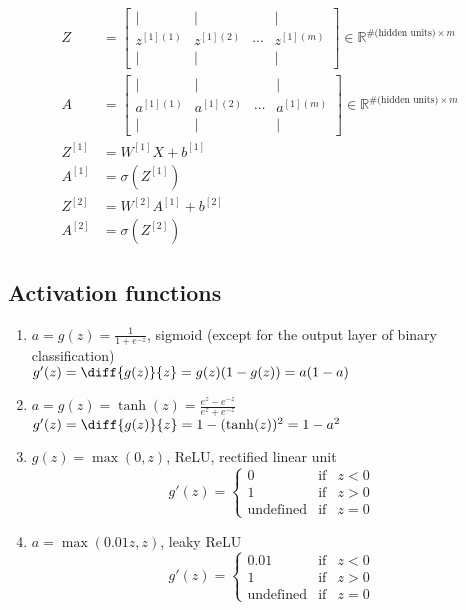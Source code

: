 \begin{itemize}
\begin{align*}
    Z & = \begin{bmatrix} |&|& &| \\ z^{[1](1)} & z^{[1](2)} & \cdots & z^{[1](m)} \\ |&|& &| \end{bmatrix} \in \mathbb{R}^{\#\text{(hidden units)} \times m}\\
     A & = \begin{bmatrix} |&|& &| \\ a^{[1](1)} & a^{[1](2)} & \cdots & a^{[1](m)} \\ |&|& &| \end{bmatrix} \in \mathbb{R}^{\#\text{(hidden units)} \times m}\\
     Z^{[1]} &= W^{[1]}X + b^{[1]}\\
     A^{[1]} &= \sigma(Z^{[1]})\\
     Z^{[2]} &= W^{[2]}A^{[1]}+ b^{[2]}\\
     A^{[2]} &= \sigma(Z^{[2]})
    \end{align*}
\end{itemize}

%
\subsection{Activation functions}
\begin{enumerate}
\item
$a = g(z) = \frac{1}{1+e^{-z}}$, sigmoid (except for the output layer of binary classification)\\
$g'(z) = \diff{g(z)}{z} = g(z)(1-g(z)) = a(1-a)$
\item
$a=g(z) = \tanh(z) = \frac{e^z - e^{-z}}{e^z + e^{-z}}$\\
$g'(z) = \diff{g(z)}{z} = 1 - (\tanh(z))^2 = 1-a^2$\\
\item
$g(z)=\max{(0, z)}$, ReLU, rectified linear unit\\
\begin{equation}
g'(z) = \left\{ 
    \begin{array}{rll}
    0 & \text{if} & z < 0 \\
    1 & \text{if} & z > 0 \\
    \text{undefined} & \text{if} & z = 0
    \end{array} \right.
\end{equation}
\item
$a = \max{(0.01z, z)}$, leaky ReLU\\
\begin{equation}
g'(z) = \left\{ 
    \begin{array}{rll}
    0.01 & \text{if} & z < 0 \\
    1 & \text{if} & z > 0 \\
    \text{undefined} & \text{if} & z = 0
    \end{array} \right.
\end{equation}
\end{enumerate}

